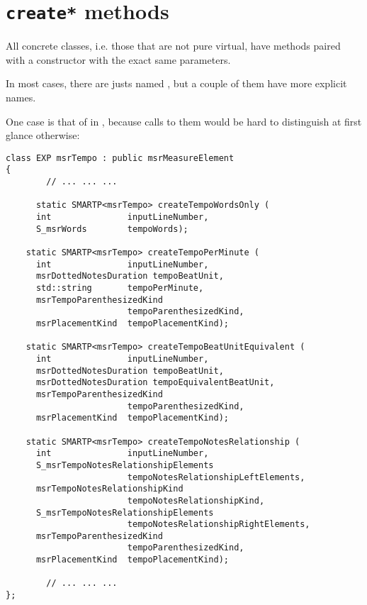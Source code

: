 \section{{\tt create*} methods}%

All concrete classes, i.e. those that are not pure virtual, have  methods paired with a constructor with the exact same parameters.

In most cases, there are justs named , but a couple of them have more explicit names.

One case is that of  in , because calls to them would be hard to distinguish at first glance otherwise:
\begin{lstlisting}[language=CPlusPlus]
 class EXP msrTempo : public msrMeasureElement
{
 		// ... ... ...

	  static SMARTP<msrTempo> createTempoWordsOnly (
      int               inputLineNumber,
      S_msrWords        tempoWords);

    static SMARTP<msrTempo> createTempoPerMinute (
      int               inputLineNumber,
      msrDottedNotesDuration tempoBeatUnit,
      std::string       tempoPerMinute,
      msrTempoParenthesizedKind
                        tempoParenthesizedKind,
      msrPlacementKind  tempoPlacementKind);

    static SMARTP<msrTempo> createTempoBeatUnitEquivalent (
      int               inputLineNumber,
      msrDottedNotesDuration tempoBeatUnit,
      msrDottedNotesDuration tempoEquivalentBeatUnit,
      msrTempoParenthesizedKind
                        tempoParenthesizedKind,
      msrPlacementKind  tempoPlacementKind);

    static SMARTP<msrTempo> createTempoNotesRelationship (
      int               inputLineNumber,
      S_msrTempoNotesRelationshipElements
                        tempoNotesRelationshipLeftElements,
      msrTempoNotesRelationshipKind
                        tempoNotesRelationshipKind,
      S_msrTempoNotesRelationshipElements
                        tempoNotesRelationshipRightElements,
      msrTempoParenthesizedKind
                        tempoParenthesizedKind,
      msrPlacementKind  tempoPlacementKind);

		// ... ... ...
};
\end{lstlisting}

